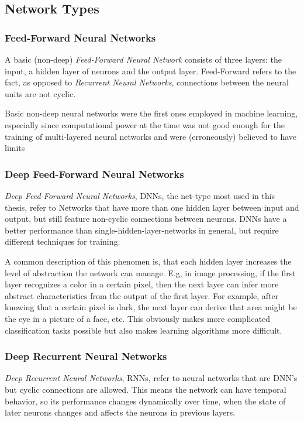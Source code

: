 \subsection{Network Types}
\label{sec:fund:types}

\subsubsection{Feed-Forward Neural Networks}
A basic (non-deep) \textit{Feed-Forward Neural Network} consists of three layers: the input, a hidden layer of neurons and the output layer. Feed-Forward refers to the fact, as opposed to \textit{Recurrent Neural Networks}, connections between the neural units are not cyclic. 

Basic non-deep neural networks were the first ones employed in machine learning, especially since computational power at the time was not good enough for the training of multi-layered neural networks and were (erroneously) believed to have limits~\cite{minsky1988perceptrons}


\subsubsection{Deep Feed-Forward Neural Networks}
\textit{Deep Feed-Forward Neural Networks}, DNNs, the net-type most used in this thesis, refer to Networks that have more than one hidden layer between input and output, but still feature non-cyclic connections between neurons. DNNs have a better performance than single-hidden-layer-networks in general, but require different techniques for training. 

A common description of this phenomen is, that each hidden layer increases the level of abstraction the network can manage. E.g, in image processing, if the first layer recognizes a color in a certain pixel, then the next layer can infer more abstract characteristics from the output of the first layer. For example, after knowing that a certain pixel is dark, the next layer can derive that area might be the eye in a picture of a face, etc. This obviously makes more complicated classification tasks possible but also makes learning algorithms more difficult.

\subsubsection{Deep Recurrent Neural Networks}
\textit{Deep Recurrent Neural Networks}, RNNs, refer to neural networks that are DNN's but cyclic connections are allowed. This means the network can have temporal behavior, so its performance changes dynamically over time, when the state of later neurons changes and affects the neurons in previous layers.

